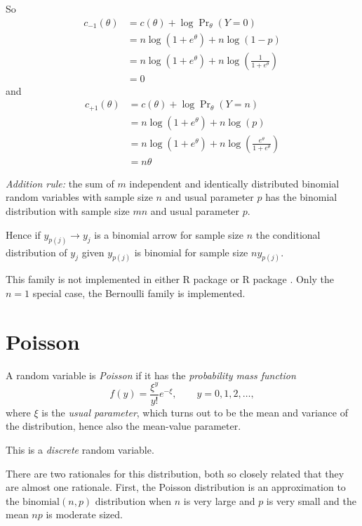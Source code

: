 So
\begin{align*}
   c_{- 1}(\theta)
   & =
   c(\theta) + \log \Pr\nolimits_\theta(Y = 0)
   \\
   & =
   n \log\left(1 + e^\theta\right)
   +
   n \log (1 - p)
   \\
   & =
   n \log\left(1 + e^\theta\right)
   +
   n \log \left(\frac{1}{1 + e^\theta}\right)
   \\
   & =
   0
\end{align*}
and
\begin{align*}
   c_{+ 1}(\theta)
   & =
   c(\theta) + \log \Pr\nolimits_\theta(Y = n)
   \\
   & =
   n \log\left(1 + e^\theta\right)
   +
   n \log (p)
   \\
   & =
   n \log\left(1 + e^\theta\right)
   +
   n \log \left(\frac{e^\theta}{1 + e^\theta}\right)
   \\
   & =
   n \theta
\end{align*}

\emph{Addition rule:}
the sum of $m$ independent and identically distributed
binomial random variables with sample size $n$ and usual parameter $p$
has the binomial distribution with sample size $m n$ and usual parameter $p$.

Hence if $y_{p(j)} \longrightarrow y_j$ is a binomial arrow for sample size $n$
the conditional distribution of $y_j$ given $y_{p(j)}$ is binomial
for sample size $n y_{p(j)}$.

This family is not implemented in either R package  or
R package .  Only the $n = 1$ special case, the Bernoulli
family is implemented.

\section{Poisson}
\label{sec:poisson}

A random variable is \emph{Poisson} if it has
the \emph{probability mass function}
\begin{equation} \label{eq:poisson-pmf}
   f(y) = \frac{\xi^y}{y !} e^{- \xi}, \qquad y = 0, 1, 2, \ldots,
\end{equation}
where $\xi$ is the \emph{usual parameter}, which turns out to be the
mean and variance of the distribution, hence also the mean-value parameter.

This is a \emph{discrete} random variable.

There are two rationales for this distribution, both so closely related
that they are almost one rationale.  First, the Poisson distribution is
an approximation to the $\text{binomial}(n, p)$ distribution when $n$
is very large and $p$ is very small and the mean $n p$ is moderate sized.

